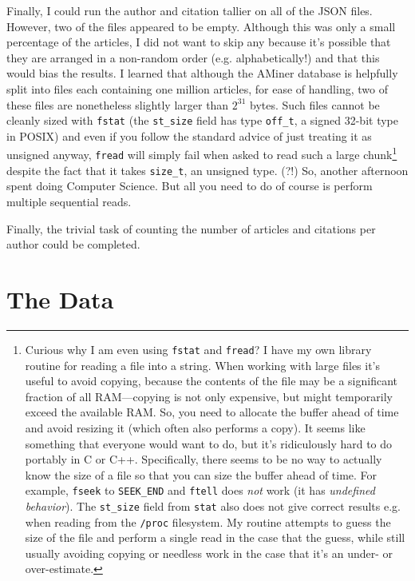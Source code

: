 \documentclass[twocolumn]{article}
\begin{document}
Finally, I could run the author and citation tallier on all of the
JSON files. However, two of the files appeared to be empty. Although
this was only a small percentage of the articles, I did not want to
skip any because it's possible that they are arranged in a non-random
order (e.g. alphabetically!) and that this would bias the results. I
learned that although the AMiner database is helpfully split into
files each containing one million articles, for ease of handling, two
of these files are nonetheless slightly larger than $2^{31}$ bytes. Such
files cannot be cleanly sized with \verb+fstat+ (the \verb+st_size+
field has type \verb+off_t+, a signed 32-bit type in POSIX) and even
if you follow the standard advice of just treating it as unsigned
anyway, \verb+fread+ will simply fail when asked to read such a large
chunk\footnote{
%
  Curious why I am even using {\tt fstat} and {\tt fread}? I have my
  own library routine for reading a file into a string. When working
  with large files it's useful to avoid copying, because the contents
  of the file may be a significant fraction of all RAM---copying is
  not only expensive, but might temporarily exceed the available RAM.
  So, you need to allocate the buffer ahead of time and avoid resizing
  it (which often also performs a copy). It seems like something that
  everyone would want to do, but it's ridiculously hard to do portably
  in C or C++. Specifically, there seems to be no way to actually know
  the size of a file so that you can size the buffer ahead of time.
  For example, {\tt fseek} to {\tt SEEK\_END} and {\tt ftell} does
  {\em not} work (it has {\em undefined behavior}). The {\tt st\_size}
  field from {\tt stat} also does not give correct results e.g. when
  reading from the {\tt /proc} filesystem. My routine attempts to
  guess the size of the file and perform a single read in the case
  that the guess, while still usually avoiding copying or needless
  work in the case that it's an under- or over-estimate.
%
} despite the fact that it takes \verb+size_t+, an unsigned type. (?!)
So, another afternoon spent doing Computer Science. But all you need
to do of course is perform multiple sequential reads.

Finally, the trivial task of counting the number of articles and
citations per author could be completed.

\section{The Data}
\end{document}
